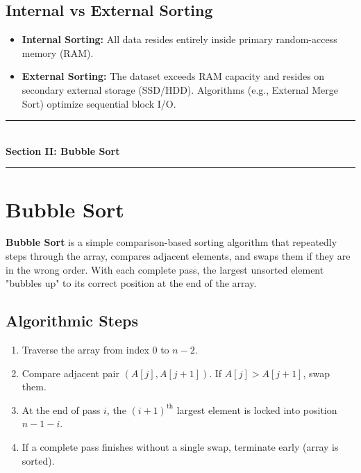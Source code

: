 \subsection{Internal vs External Sorting}

\begin{itemize}
    \item \textbf{Internal Sorting:} All data resides entirely inside primary random-access memory (RAM).
    \item \textbf{External Sorting:} The dataset exceeds RAM capacity and resides on secondary external storage (SSD/HDD). Algorithms (e.g., External Merge Sort) optimize sequential block I/O.
\end{itemize}

\newpage
\begin{center}
\vspace{0.5em}
{\color{primary}\rule{0.45\textwidth}{1.2pt}}\\[4pt]
{\Large\bfseries\color{primary} Section II: Bubble Sort}\\[2pt]
{\color{primary}\rule{0.45\textwidth}{1.2pt}}
\vspace{0.5em}
\end{center}

\section{Bubble Sort}

\textbf{Bubble Sort} is a simple comparison-based sorting algorithm that repeatedly steps through the array, compares adjacent elements, and swaps them if they are in the wrong order. With each complete pass, the largest unsorted element "bubbles up" to its correct position at the end of the array.

\subsection{Algorithmic Steps}
\begin{enumerate}
    \item Traverse the array from index $0$ to $n-2$.
    \item Compare adjacent pair $(A[j], A[j+1])$. If $A[j] > A[j+1]$, swap them.
    \item At the end of pass $i$, the $(i+1)^{\text{th}}$ largest element is locked into position $n - 1 - i$.
    \item If a complete pass finishes without a single swap, terminate early (array is sorted).
\end{enumerate}


